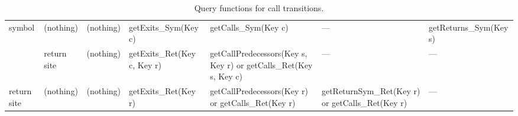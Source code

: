 \begin{sidewaystable}
\begin{tabular}{x{0.6in}x{0.6in}x{0.6in}|x{1.9in}x{1.9in}x{1.9in}x{2in}}
 symbol         &  (nothing)        &  (nothing)    & getExits\_Sym(Key c)          &  getCalls\_Sym(Key c)                 &   ---                                      &  getReturns\_Sym(Key s)                     \tabularnewline
                &  return site      &  (nothing)    & getExits\_Ret(Key c, Key r)   &  getCallPredecessors(Key s, Key r) \newline
                                                                                       or getCalls\_Ret(Key s, Key c)       &   ---                                      &   ---                                       \tabularnewline
\midrule %
 return site    &  (nothing)         & (nothing)    & getExits\_Ret(Key r)          &  getCallPredecessors(Key r) \newline
                                                                                       or getCalls\_Ret(Key r)              &  getReturnSym\_Ret(Key r) or \newline
                                                                                                                               getCalls\_Ret(Key r)                      &   ---                                       \tabularnewline
\bottomrule\bottomrule
\end{tabular}
\caption{Query functions for call transitions.}
\end{sidewaystable}
\restoregeometry
